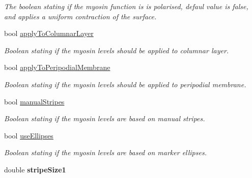 \begin{DoxyCompactItemize}
\begin{DoxyCompactList}\small\item\em The boolean stating if the myosin function is is polarised, defaul value is false, and applies a uniform contraction of the surface. \end{DoxyCompactList}\item 
\hypertarget{classMyosinFunction_a6a978e5577af3f6b56edda5fd825d89c}{}bool \hyperlink{classMyosinFunction_a6a978e5577af3f6b56edda5fd825d89c}{apply\+To\+Columnar\+Layer}\label{classMyosinFunction_a6a978e5577af3f6b56edda5fd825d89c}

\begin{DoxyCompactList}\small\item\em Boolean stating if the myosin levels should be applied to columnar layer. \end{DoxyCompactList}\item 
\hypertarget{classMyosinFunction_a76b32da8850a97ca48046d34542ee1c0}{}bool \hyperlink{classMyosinFunction_a76b32da8850a97ca48046d34542ee1c0}{apply\+To\+Peripodial\+Membrane}\label{classMyosinFunction_a76b32da8850a97ca48046d34542ee1c0}

\begin{DoxyCompactList}\small\item\em Boolean stating if the myosin levels should be applied to peripodial membrane. \end{DoxyCompactList}\item 
\hypertarget{classMyosinFunction_af9847dcd6e9db66662d90e3e4ba4cc0b}{}bool \hyperlink{classMyosinFunction_af9847dcd6e9db66662d90e3e4ba4cc0b}{manual\+Stripes}\label{classMyosinFunction_af9847dcd6e9db66662d90e3e4ba4cc0b}

\begin{DoxyCompactList}\small\item\em Boolean stating if the myosin levels are based on manual stripes. \end{DoxyCompactList}\item 
\hypertarget{classMyosinFunction_ab4855e57c0b991e97d3ed2c578728ec4}{}bool \hyperlink{classMyosinFunction_ab4855e57c0b991e97d3ed2c578728ec4}{use\+Ellipses}\label{classMyosinFunction_ab4855e57c0b991e97d3ed2c578728ec4}

\begin{DoxyCompactList}\small\item\em Boolean stating if the myosin levels are based on marker ellipses. \end{DoxyCompactList}\item 
\hypertarget{classMyosinFunction_aae36807a55b8886c6ebfe24598a160ea}{}double {\bfseries stripe\+Size1}\label{classMyosinFunction_aae36807a55b8886c6ebfe24598a160ea}


\end{DoxyCompactItemize}
